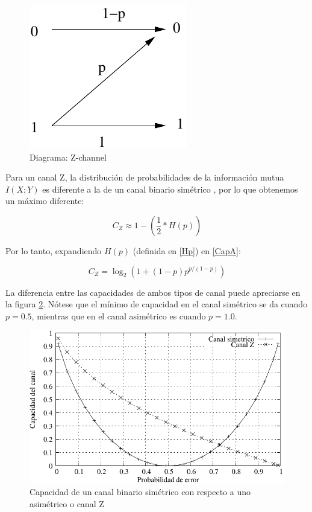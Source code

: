\begin{figure}[th]
  \begin{center}
    \includegraphics[scale=0.5]{capacidad/zchannel}
  \end{center}
  \caption{Diagrama: Z-channel}
  \label{fig:Gal}
\end{figure}

Para un canal Z, la distribución de probabilidades de la información mutua $I(X;Y)$ es diferente a la de un canal binario simétrico \cite{Tallini:02}, por lo que obtenemos un máximo diferente:

\begin{equation}\label{CapA}
C_{Z} \approx 1 - \left(\frac{1}{2}*H(p)\right)
\end{equation}

Por lo tanto, expandiendo $H(p)$ (definida en \ref{Hp}) en \ref{CapA}:

$$ C_{Z} = \log_2\left(1+(1-p) p^{p/(1-p)}\right) $$

La diferencia entre las capacidades de ambos tipos de canal puede apreciarse en la figura \ref{fig:CompBZ}. Nótese que el mínimo de capacidad en el canal simétrico se da cuando $p=0.5$, mientras que en el canal asimétrico es cuando $p=1.0$.

\begin{figure}[th]
  \begin{center}
    \includegraphics[scale=0.9]{graphs/grafico_comparacion_capacidad_binaria_z}
  \end{center}
  \caption{Capacidad de un canal binario simétrico con respecto a uno asimétrico o canal Z}
  \label{fig:CompBZ}
\end{figure}


